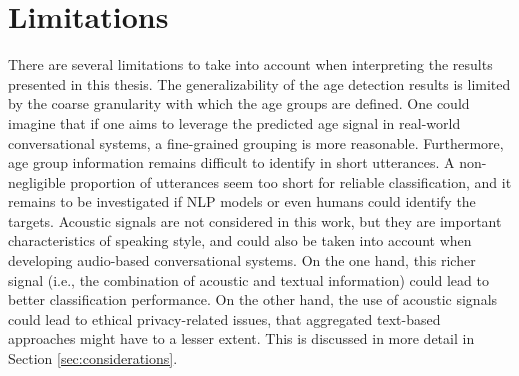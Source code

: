 
\section{Limitations}\label{sec:limitations}


There are several limitations to take into account when interpreting the results presented in this thesis. The generalizability of the age detection results is limited by the coarse granularity with which the age groups are defined. One could imagine that if one aims to leverage the predicted age signal in real-world conversational systems, a fine-grained grouping is more reasonable. Furthermore, age group information remains difficult to identify in short utterances. A non-negligible proportion of utterances seem too short for reliable classification, and it remains to be investigated if NLP models or even humans could identify the targets.
Acoustic signals are not considered in this work, but they are important characteristics of speaking style, and could also be taken into account when developing audio-based conversational systems. On the one hand, this richer signal (i.e., the combination of acoustic and textual information) could lead to better classification performance. On the other hand, the use of acoustic signals could lead to ethical privacy-related issues, that aggregated text-based approaches might have to a lesser extent. 
This is discussed in more detail in Section \ref{sec:considerations}.

